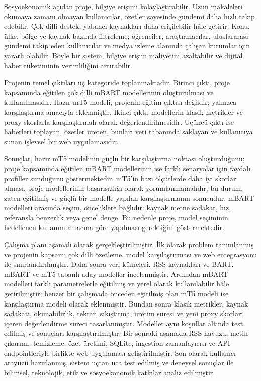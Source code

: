 Sosyoekonomik açıdan proje, bilgiye erişimi kolaylaştırabilir. Uzun makaleleri okumaya zamanı olmayan kullanıcılar, özetler sayesinde gündemi daha hızlı takip edebilir. Çok dilli destek, yabancı kaynakları daha erişilebilir hâle getirir. Konu, ülke, bölge ve kaynak bazında filtreleme; öğrenciler, araştırmacılar, uluslararası gündemi takip eden kullanıcılar ve medya izleme alanında çalışan kurumlar için yararlı olabilir. Böyle bir sistem, bilgiye erişim maliyetini azaltabilir ve dijital haber tüketiminin verimliliğini artırabilir.

Projenin temel çıktıları üç kategoride toplanmaktadır. Birinci çıktı, proje kapsamında eğitilen çok dilli mBART modellerinin oluşturulması ve kullanılmasıdır. Hazır mT5 modeli, projenin eğitim çıktısı değildir; yalnızca karşılaştırma amacıyla eklenmiştir. İkinci çıktı, modellerin klasik metrikler ve proxy skorlarla karşılaştırmalı olarak değerlendirilmesidir. Üçüncü çıktı ise haberleri toplayan, özetler üreten, bunları veri tabanında saklayan ve kullanıcıya sunan işlevsel bir web uygulamasıdır.

Sonuçlar, hazır mT5 modelinin güçlü bir karşılaştırma noktası oluşturduğunu; proje kapsamında eğitilen mBART modellerinin ise farklı senaryolar için faydalı profiller sunduğunu göstermektedir. mT5’in bazı ölçütlerde daha iyi skorlar alması, proje modellerinin başarısızlığı olarak yorumlanmamalıdır; bu durum, zaten eğitilmiş ve güçlü bir modelle yapılan karşılaştırmanın sonucudur. mBART modelleri arasında seçim, önceliklere bağlıdır: kaynak metne sadakat, hız, referansla benzerlik veya genel denge. Bu nedenle proje, model seçiminin hedeflenen kullanım amacına göre yapılması gerektiğini göstermektedir.

Çalışma planı aşamalı olarak gerçekleştirilmiştir. İlk olarak problem tanımlanmış ve projenin kapsamı çok dilli özetleme, model karşılaştırması ve web entegrasyonu ile sınırlandırılmıştır. Daha sonra veri kümeleri, RSS kaynakları ve BART, mBART ve mT5 tabanlı aday modeller incelenmiştir. Ardından mBART modelleri farklı parametrelerle eğitilmiş ve yerel olarak kullanılabilir hâle getirilmiştir; benzer bir çalışmada önceden eğitilmiş olan mT5 modeli ise karşılaştırma modeli olarak eklenmiştir. Bundan sonra klasik metrikler, kaynak sadakati, okunabilirlik, tekrar, sıkıştırma, üretim süresi ve yeni proxy skorları içeren değerlendirme süreci tasarlanmıştır. Modeller aynı koşullar altında test edilmiş ve sonuçları karşılaştırılmıştır. Bir sonraki aşamada RSS havuzu, metin çıkarımı, temizleme, özet üretimi, SQLite, ingestion zamanlayıcısı ve API endpointleriyle birlikte web uygulaması geliştirilmiştir. Son olarak kullanıcı arayüzü hazırlanmış, sistem uçtan uca test edilmiş ve deneysel sonuçlar ile bilimsel, teknolojik, etik ve sosyoekonomik katkılar analiz edilmiştir. 


